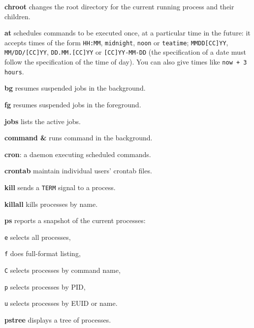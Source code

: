 \begin{enumx}
	\item [\cmdblack] \textbf{chroot} changes the root directory 
	for the current running process and their children.
\end{enumx}

\begin{enumx}
	\item [\cmd] \textbf{at} schedules commands to be executed once, 
	at a particular time in the future: it accepts times of the form 
	\texttt{HH:MM}, \texttt{midnight}, \texttt{noon} or \texttt{teatime}; 
	\texttt{MMDD[CC]YY}, \texttt{MM/DD/[CC]YY}, \texttt{DD.MM.[CC]YY} or 
	\texttt{[CC]YY-MM-DD} (the specification of a date 
	must follow the specification of the time of day).
	You can also give times like \texttt{now + 3 hours}.
\end{enumx}

\begin{enumx}
	\item [\cmd] \textbf{bg} resumes suspended jobs in the background.
	\item [\cmd] \textbf{fg} resumes suspended jobs in the foreground.
	\item [\cmd] \textbf{jobs} lists the active jobs.
	\item [\cmd] \textbf{command \&} runs command in the background.
\end{enumx}

\begin{enumx}
	\item [\cmd] \textbf{cron}: a daemon executing scheduled commands.
	\item [\cmd] \textbf{crontab} maintain individual users' crontab files.
\end{enumx}

\begin{enumx}
	\item [\cmd] \textbf{kill} sends a \texttt{TERM} signal to a process.
	\item [\cmd] \textbf{killall} kills processes by name.
\end{enumx}

\begin{enumx}
	\item [\cmd] \textbf{ps} reports a snapshot of the current processes:
	\item [\texttt{e}] selects all processes,
	\item [\texttt{f}] does full-format listing,
	\item [\texttt{C}] selects processes by command name,
	\item [\texttt{p}] selects processes by PID,
	\item [\texttt{u}] selects processes by EUID or name. 
	\item [\cmd] \textbf{pstree} displays a tree of processes.
\end{enumx}

